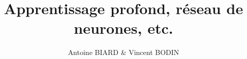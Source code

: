 \documentclass[handout]{beamer}
\title{Apprentissage profond, réseau de neurones, etc.}
\author{Antoine BIARD \& Vincent BODIN}
\begin{document}
\renewcommand{\contentsname}{Sommaire}


\begin{frame}[allowframebreaks]
\titlepage
\end{frame}



\end{document}
